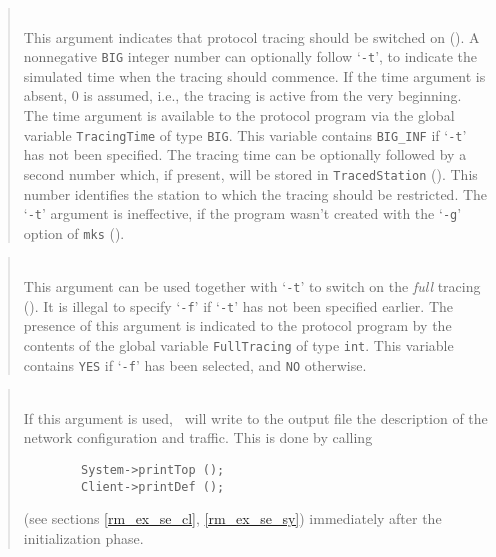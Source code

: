 \begin{quote}
\noindent{}\\ \hspace{0in}
This argument indicates that protocol tracing should be switched on
().
A nonnegative {\tt BIG} integer number can optionally follow `{\tt -t}',
to indicate the simulated time when the tracing should commence.
If the time argument is absent, 0 is assumed, i.e.,
the tracing is active from the very beginning.
The time argument is available to the protocol program via the global
variable {\tt TracingTime} of type {\tt BIG}.
This variable contains {\tt BIG\_INF} if `{\tt -t}' has not been specified.
The tracing time can be optionally followed by a second number which,
if present, will be stored in {\tt TracedStation} ().
This number identifies the station to which the tracing should be
restricted.
The `{\tt -t}' argument is ineffective, if the program wasn't created
with the `{\tt -g}' option of {\tt mks} ().
\end{quote}

\begin{quote}
\noindent{}\\ \hspace{0in}
This argument can be used together with `{\tt -t}' to switch on the
{\em full\/} tracing ().
It is illegal to specify `{\tt -f}' if `{\tt -t}' has not been specified
earlier.
The presence of this argument is indicated to the protocol program by the
contents of the global variable {\tt FullTracing} of type {\tt int}.
This variable contains {\tt YES} if `{\tt -f}' has been selected, and
{\tt NO} otherwise.
\end{quote}

\begin{quote}
\noindent{}\\ \hspace{0in}
If this argument is used, \smurph\ will write to the
output file the description of the network configuration and traffic.
This is done by calling
\begin{verbatim}
        System->printTop ();
        Client->printDef ();
\end{verbatim}
(see sections \ref{rm_ex_se_cl}, \ref{rm_ex_se_sy}) immediately after the
initialization phase.
\end{quote}

